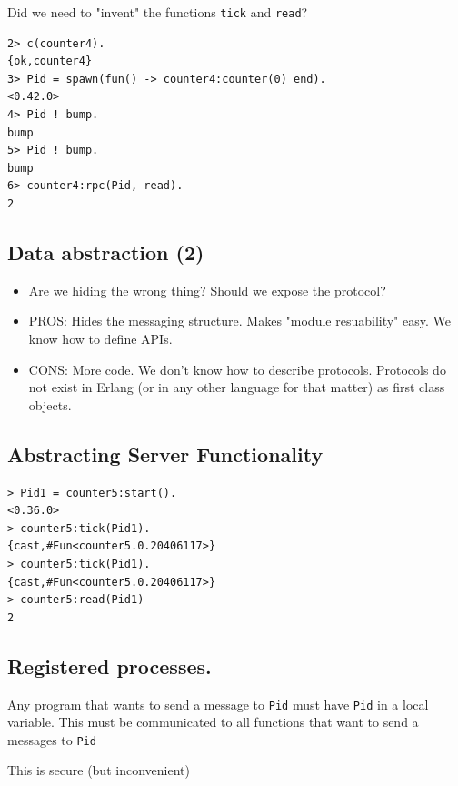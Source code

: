 \documentclass[12pt]{article}
\begin{document}
\begin{itemize}
Did we need to "invent" the functions \verb+tick+ and \verb+read+?

\begin{verbatim}
2> c(counter4).
{ok,counter4}
3> Pid = spawn(fun() -> counter4:counter(0) end).
<0.42.0>
4> Pid ! bump.
bump
5> Pid ! bump.
bump
6> counter4:rpc(Pid, read).
2
\end{verbatim}



\subsection{Data abstraction (2)}

\begin{itemize}
\item Are we hiding the wrong thing? Should we expose the protocol?
\item PROS:
Hides the messaging structure.
Makes "module resuability" easy.
We know how to define APIs.
\item CONS:
More code.
We don't know how to describe protocols.
Protocols do not exist in Erlang (or in any other language
for that matter) as first class objects.
\end{itemize}

\subsection{Abstracting Server Functionality }





\begin{verbatim}
> Pid1 = counter5:start().
<0.36.0>
> counter5:tick(Pid1).
{cast,#Fun<counter5.0.20406117>}
> counter5:tick(Pid1).
{cast,#Fun<counter5.0.20406117>}
> counter5:read(Pid1)
2
\end{verbatim}

\subsection{Registered processes.}

Any program that wants to send a message to \verb+Pid+ must have
\verb+Pid+ in a local variable. This must be communicated to all
functions that want to send a messages to \verb+Pid+

This is secure (but inconvenient)


\end{itemize}
\end{document}
